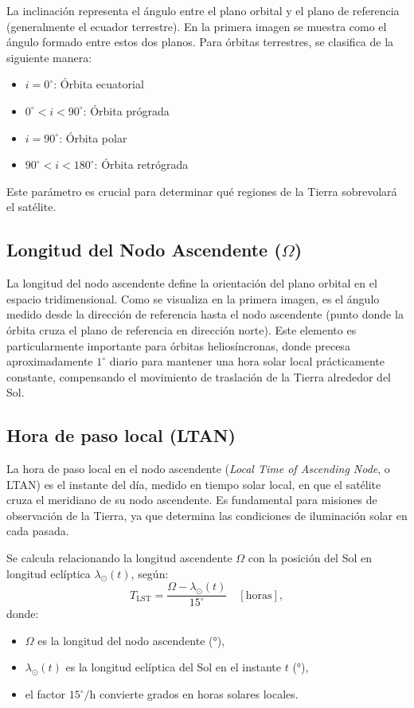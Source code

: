 La inclinación representa el ángulo entre el plano orbital y el plano de referencia (generalmente el ecuador terrestre). En la primera imagen se muestra como el ángulo formado entre estos dos planos. Para órbitas terrestres, se clasifica de la siguiente manera:

\begin{itemize}
  \item $i = 0^\circ$: Órbita ecuatorial
  \item $0^\circ < i < 90^\circ$: Órbita prógrada
  \item $i = 90^\circ$: Órbita polar
  \item $90^\circ < i < 180^\circ$: Órbita retrógrada
\end{itemize}

Este parámetro es crucial para determinar qué regiones de la Tierra sobrevolará el satélite.

\subsection{Longitud del Nodo Ascendente \texorpdfstring{($\Omega$)}{(Omega)}}

La longitud del nodo ascendente define la orientación del plano orbital en el espacio tridimensional. Como se visualiza en la primera imagen, es el ángulo medido desde la dirección de referencia hasta el nodo ascendente (punto donde la órbita cruza el plano de referencia en dirección norte). Este elemento es particularmente importante para órbitas heliosíncronas, donde precesa aproximadamente $1^\circ$ diario para mantener una hora solar local prácticamente constante, compensando el movimiento de traslación de la Tierra alrededor del Sol.

\subsection{Hora de paso local (LTAN)}

La hora de paso local en el nodo ascendente (\textit{Local Time of Ascending Node}, o LTAN) es el instante del día, medido en tiempo solar local, en que el satélite cruza el meridiano de su nodo ascendente. Es fundamental para misiones de observación de la Tierra, ya que determina las condiciones de iluminación solar en cada pasada.

Se calcula relacionando la longitud ascendente $\Omega$ con la posición del Sol en longitud eclíptica $\lambda_\odot(t)$, según:
\[
T_{\mathrm{LST}} 
= \frac{\Omega - \lambda_\odot(t)}{15^\circ}\quad[\mathrm{horas}],
\]
donde:
\begin{itemize}
  \item $\Omega$ es la longitud del nodo ascendente (°),
  \item $\lambda_\odot(t)$ es la longitud eclíptica del Sol en el instante $t$ (°),
  \item el factor $15^\circ/$h convierte grados en horas solares locales.
\end{itemize}

